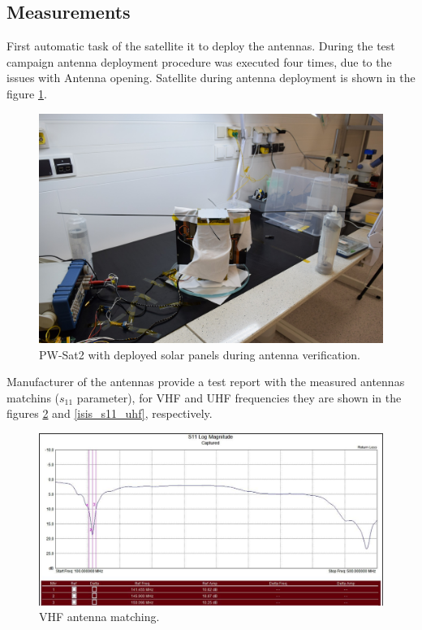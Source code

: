 \subsection{Measurements}
First automatic task of the satellite it to deploy the antennas. During the test campaign antenna deployment procedure was executed four times, due to the issues with Antenna opening. Satellite during antenna deployment is shown in the figure \ref{pwsat_with_deployed_antennas}.

\begin{figure}
    \centering
    \includegraphics[width=0.6\paperwidth]{img/4/pwsat_with_deployed_antennas.JPG}
    \caption{PW-Sat2 with deployed solar panels during antenna verification.}
    \label{pwsat_with_deployed_antennas}
\end{figure}

Manufacturer of the antennas provide a test report with the measured antennas matchins ($s_{11}$ parameter), for VHF and UHF frequencies they are shown in the figures \ref{isis_s11_vhf} and  \ref{isis_s11_uhf}, respectively.

\begin{figure}
    \centering
    \includegraphics[width=0.8\paperwidth]{img/4/isis_s11_vhf.png}
    \caption{VHF antenna matching.}
    \label{isis_s11_vhf}
\end{figure}

